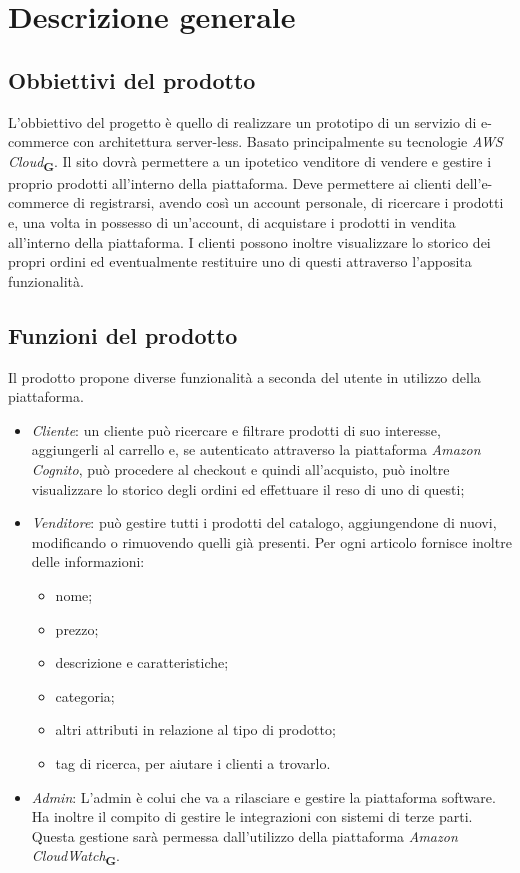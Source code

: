 \section{Descrizione generale}
\subsection{Obbiettivi del prodotto}
L'obbiettivo del progetto è quello di realizzare un prototipo di un servizio di e-commerce con architettura server-less. Basato principalmente su tecnologie \textit{AWS Cloud}\textsubscript{\textbf{G}}. Il sito dovrà permettere a un ipotetico venditore di vendere e gestire i proprio prodotti all'interno della piattaforma. Deve permettere ai clienti dell'e-commerce di registrarsi, avendo così un account personale, di ricercare i prodotti e, una volta in possesso di un'account, di acquistare i prodotti in vendita all'interno della piattaforma. I clienti possono inoltre visualizzare lo storico dei propri ordini ed eventualmente restituire uno di questi attraverso l'apposita funzionalità.
\subsection{Funzioni del prodotto}
Il prodotto propone diverse funzionalità a seconda del utente in utilizzo della piattaforma.
\begin{itemize}
    \item \textit{Cliente}: un cliente può ricercare e filtrare prodotti di suo interesse, aggiungerli al carrello e, se autenticato attraverso la piattaforma \textit{Amazon Cognito}, può procedere al checkout e quindi all'acquisto, può inoltre visualizzare lo storico degli ordini ed effettuare il reso di uno di questi;
    \item \textit{Venditore}: può gestire tutti i prodotti del catalogo, aggiungendone di nuovi, modificando o rimuovendo quelli già presenti. Per ogni articolo fornisce inoltre delle  informazioni:
    \begin{itemize}
        \item nome;
        \item prezzo;
        \item descrizione e caratteristiche;
        \item categoria;
        \item altri attributi in relazione al tipo di prodotto;
        \item tag di ricerca, per aiutare i clienti a trovarlo.
    \end{itemize}
    \item \textit{Admin}: L'admin è colui che va a rilasciare e gestire la piattaforma software. Ha inoltre il compito di gestire le integrazioni con sistemi di terze parti. Questa gestione sarà permessa dall'utilizzo della piattaforma \textit{Amazon CloudWatch}\textsubscript{\textbf{G}}.
\end{itemize}

